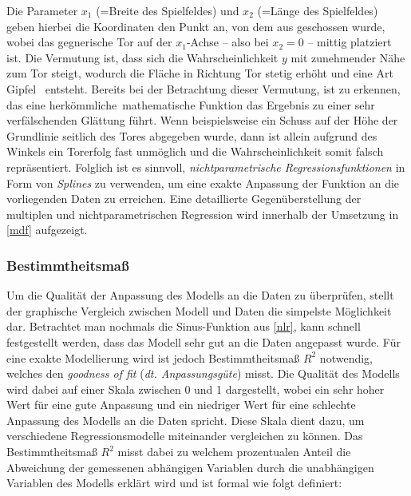 Die Parameter $x_1$ (=Breite des Spielfeldes) und $x_2$ (=Länge des Spielfeldes) geben hierbei die Koordinaten den Punkt an, von dem aus geschossen wurde, wobei das gegnerische Tor auf der $x_1$-Achse -- also bei $x_2=0$ -- mittig platziert ist. Die Vermutung ist, dass sich die Wahrscheinlichkeit $y$ mit zunehmender Nähe zum Tor steigt, wodurch die Fläche in Richtung Tor stetig erhöht und eine Art \glqq Gipfel\grqq~ entsteht. Bereits bei der Betrachtung dieser Vermutung, ist zu erkennen, das eine \glqq herkömmliche\grqq~mathematische Funktion das Ergebnis zu einer sehr verfälschenden Glättung führt. Wenn beispielsweise ein Schuss auf der Höhe der Grundlinie seitlich des Tores abgegeben wurde, dann ist allein aufgrund des Winkels ein Torerfolg fast unmöglich und die Wahrscheinlichkeit somit falsch repräsentiert. Folglich ist es sinnvoll, \textit{nichtparametrische Regressionsfunktionen} in Form von \textit{Splines} zu verwenden, um eine exakte Anpassung der Funktion an die vorliegenden Daten zu erreichen. Eine detaillierte Gegenüberstellung der multiplen und nichtparametrischen Regression wird innerhalb der Umsetzung in \vref{mdf} aufgezeigt.

\subsubsection{Bestimmtheitsmaß}
\label{bhm}
Um die Qualität der Anpassung des Modells an die Daten zu überprüfen, stellt der graphische Vergleich zwischen Modell und Daten die simpelste Möglichkeit dar. Betrachtet man nochmals die Sinus-Funktion aus \vref{nlr}, kann schnell festgestellt werden, dass das Modell sehr gut an die Daten angepasst wurde. Für eine exakte Modellierung wird ist jedoch Bestimmtheitsmaß $R^2$ notwendig, welches den \textit{goodness of fit} (\textit{dt. Anpassungsgüte}) misst. Die Qualität des Modells wird dabei auf einer Skala zwischen 0 und 1 dargestellt, wobei ein sehr hoher Wert für eine gute Anpassung und ein niedriger Wert für eine schlechte Anpassung des Modells an die Daten spricht. Diese Skala dient dazu, um verschiedene Regressionsmodelle miteinander vergleichen zu können. Das Bestimmtheitsmaß $R^2$ misst dabei zu welchem prozentualen Anteil die Abweichung der gemessenen abhängigen Variablen durch die unabhängigen Variablen des Modells erklärt wird und ist formal wie folgt definiert:

